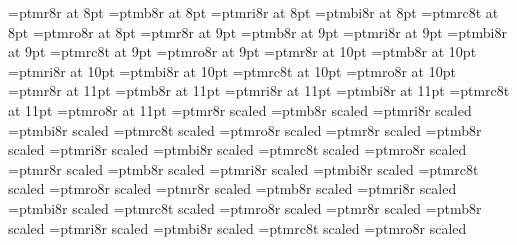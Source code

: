 %
\immediate{}
%
\font\eightrm=ptmr8r at 8pt
\font\eightbf=ptmb8r at 8pt
\font\eightit=ptmri8r at 8pt
\font\eightbi=ptmbi8r at 8pt
\font\eightsc=ptmrc8t at 8pt  %
\font\eightsl=ptmro8r at 8pt
%
\font\ninerm=ptmr8r at 9pt
\font\ninebf=ptmb8r at 9pt
\font\nineit=ptmri8r at 9pt
\font\ninebi=ptmbi8r at 9pt
\font\ninesc=ptmrc8t at 9pt
\font\ninesl=ptmro8r at 9pt
%
\font\tenrm=ptmr8r at 10pt
\font\tenbf=ptmb8r at 10pt
\font\tenit=ptmri8r at 10pt
\font\tenbi=ptmbi8r at 10pt
\font\tensc=ptmrc8t at 10pt
\font\tensl=ptmro8r at 10pt
%
%
\font\elevenrm=ptmr8r at 11pt
\font\elevenbf=ptmb8r at 11pt
\font\elevenit=ptmri8r at 11pt
\font\elevenbi=ptmbi8r at 11pt
\font\elevensc=ptmrc8t at 11pt
\font\elevensl=ptmro8r at 11pt
%
\font\twelverm=ptmr8r scaled 
\font\twelvebf=ptmb8r scaled 
\font\twelveit=ptmri8r scaled 
\font\twelvebi=ptmbi8r scaled 
\font\twelvesc=ptmrc8t scaled 
\font\twelvesl=ptmro8r scaled 
%
\font\frtrm=ptmr8r scaled 
\font\frtbf=ptmb8r scaled 
\font\frtit=ptmri8r scaled 
\font\frtbi=ptmbi8r scaled 
\font\frtsc=ptmrc8t scaled 
\font\frtsl=ptmro8r scaled 
%
\font\svtrm=ptmr8r scaled 
\font\svtbf=ptmb8r scaled 
\font\svtit=ptmri8r scaled 
\font\svtbi=ptmbi8r scaled 
\font\svtsc=ptmrc8t scaled 
\font\svtsl=ptmro8r scaled 
%
\font\twtyrm=ptmr8r scaled 
\font\twtybf=ptmb8r scaled 
\font\twtyit=ptmri8r scaled 
\font\twtybi=ptmbi8r scaled 
\font\twtysc=ptmrc8t scaled 
\font\twtysl=ptmro8r scaled 
%
\font\twfvrm=ptmr8r scaled 
\font\twfvbf=ptmb8r scaled 
\font\twfvit=ptmri8r scaled 
\font\twfvbi=ptmbi8r scaled 
\font\twfvsc=ptmrc8t scaled 
\font\twfvsl=ptmro8r scaled 
